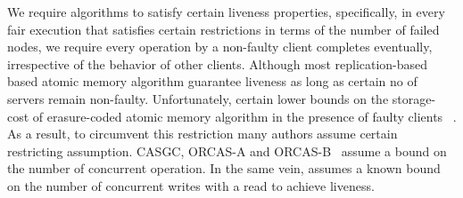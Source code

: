 
%

 We require algorithms to satisfy certain liveness properties, specifically, in every fair execution that satisfies certain restrictions in terms of the number of failed nodes, we require every operation by a non-faulty client 
completes eventually, irrespective of the behavior of other clients.  
Although most replication-based based atomic memory algorithm guarantee liveness as long as certain no of servers remain 
non-faulty.  Unfortunately, certain lower bounds on the storage-cost of erasure-coded atomic memory algorithm in the presence of faulty clients ~\cite{cadambe2016information, SCCK15}. As a result, to  circumvent this restriction many authors assume certain restricting 
assumption.  CASGC, ORCAS-A and ORCAS-B~\cite{DGL08} assume a bound on the number of concurrent operation. In the same vein, \treasmod{} assumes a known bound on the number of concurrent writes with a read to achieve liveness. 
